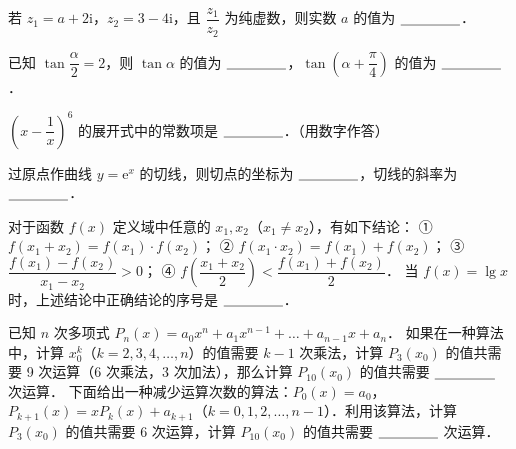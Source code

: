 \begin{question}
若 $z_1 = a + 2\mathrm{i}$，$z_2 = 3 - 4\mathrm{i}$，且 $\dfrac{z_1}{z_2}$ 为纯虚数，则实数 $a$ 的值为 $\underline{\hspace{1.5cm}}$．

\end{question}
\begin{question}
已知 $\tan\dfrac{\alpha}{2} = 2$，则 $\tan\alpha$ 的值为 $\underline{\hspace{1.5cm}}$，$\tan\left(\alpha + \dfrac{\pi}{4}\right)$ 的值为 $\underline{\hspace{1.5cm}}$．

\end{question}
\begin{question}
$\left(x - \dfrac{1}{x}\right)^6$ 的展开式中的常数项是 $\underline{\hspace{1.5cm}}$．（用数字作答）

\end{question}
\begin{question}
过原点作曲线 $y = \mathrm{e}^x$ 的切线，则切点的坐标为 $\underline{\hspace{1.5cm}}$，切线的斜率为 $\underline{\hspace{1.5cm}}$．

\end{question}
\begin{question}
对于函数 $f(x)$ 定义域中任意的 $x_1, x_2$（$x_1 \neq x_2$），有如下结论：
① $f(x_1 + x_2) = f(x_1) \cdot f(x_2)$；
② $f(x_1 \cdot x_2) = f(x_1) + f(x_2)$；
③ $\dfrac{f(x_1) - f(x_2)}{x_1 - x_2} > 0$；
④ $f\left(\dfrac{x_1 + x_2}{2}\right) < \dfrac{f(x_1) + f(x_2)}{2}$．
当 $f(x) = \lg x$ 时，上述结论中正确结论的序号是 $\underline{\hspace{1.5cm}}$．

\end{question}
\begin{question}
已知 $n$ 次多项式 $P_n(x) = a_0 x^n + a_1 x^{n-1} + \dots + a_{n-1} x + a_n$．
如果在一种算法中，计算 $x_0^k$（$k = 2, 3, 4, \dots, n$）的值需要 $k - 1$ 次乘法，计算 $P_3(x_0)$ 的值共需要 9 次运算（6 次乘法，3 次加法），那么计算 $P_{10}(x_0)$ 的值共需要 $\underline{\hspace{1.5cm}}$ 次运算．
下面给出一种减少运算次数的算法：$P_0(x) = a_0$，$P_{k+1}(x) = x P_k(x) + a_{k+1}$（$k = 0, 1, 2, \dots, n-1$）．利用该算法，计算 $P_3(x_0)$ 的值共需要 6 次运算，计算 $P_{10}(x_0)$ 的值共需要 $\underline{\hspace{1.5cm}}$ 次运算．

\end{question}

